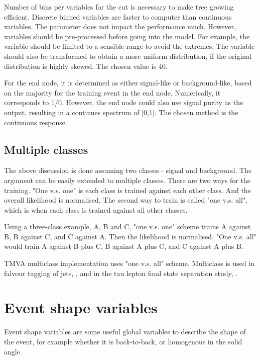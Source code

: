 Number of bins per variables for the cut is necessary to make tree growing efficient. Discrete binned variables are faster to computer than continuous variables. The parameter does not impact the performance much. However, variables should be pre-processed before going into the model. For example, the variable should be limited to a sensible range to avoid the extremes. The variable should also be transformed to obtain a more uniform distribution, if the original distribution is highly skewed. The chosen value is 40.

For the end node, it is determined as either signal-like or background-like, based on the majority for the training event in the end node. Numerically, it corresponds to 1/0. However, the end node could also use signal purity as the output, resulting in a continues spectrum of [0,1]. The chosen method is the continuous response.

\subsection{Multiple classes}

The above discussion is done assuming two classes - signal and background. The argument can be easily extended to multiple classes. There are two ways for the training. "One v.s. one" is each class is trained against each other class. And the overall likelihood is normalised. The second way to train is called "one v.s. all", which is when each class is trained against all other classes.

Using a three-class example, A, B and C, "one v.s. one" scheme trains A against B, B against C, and C against A. Then the likelihood is normalised. "One v.s. all" would train A against B plus C, B against A plus C, and C against A plus B.

TMVA multiclass implementation uses "one v.s. all" scheme. Multiclass is used in falvour tagging of jets, , and in the tau lepton final state separation study, \Section{}.

\section{Event shape variables}


Event shape variables are some useful global variables to describe the shape of the event, for example whether it is back-to-back, or homogenous in the solid angle.


